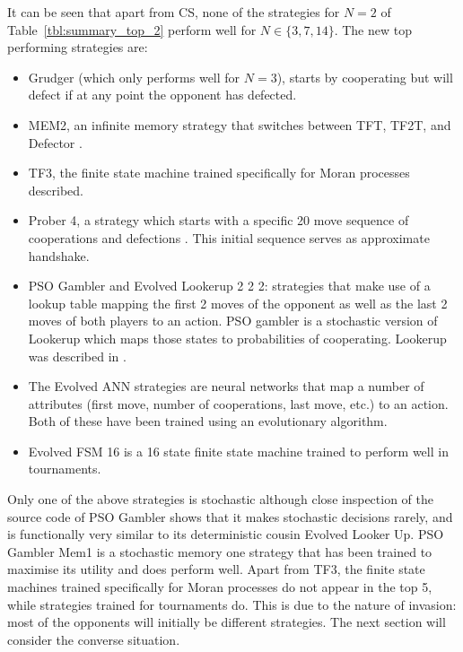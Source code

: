 \documentclass[10pt,letterpaper]{article}
\begin{document}
It can be seen that apart from CS, none of the strategies for \(N=2\)
of Table~\ref{tbl:summary_top_2} perform well for \(N\in\{3, 7, 14\}\). The new
top performing strategies are:

\begin{itemize}
    \item Grudger (which only performs well for \(N=3\)), starts by cooperating
        but will defect if at any point the opponent has defected.
    \item MEM2, an infinite memory strategy that switches between TFT, TF2T, and
        Defector \cite{Li2014}.
    \item TF3, the finite state machine trained specifically for Moran processes
        described.
    \item Prober 4, a strategy which starts with a specific 20 move sequence of
        cooperations and defections \cite{Prison1998}. This initial sequence serves
        as approximate handshake.
    \item  PSO Gambler and Evolved Lookerup 2 2 2: strategies that make use
        of a lookup table mapping the first 2 moves of the opponent as well as
        the last 2 moves of both players to an action.  PSO gambler is a
        stochastic version of  Lookerup which maps those states to probabilities
       of cooperating. Lookerup was described in \cite{Knight2016}.
    \item The Evolved ANN strategies are neural networks that map a number of
	    attributes (first move, number of cooperations, last move, etc.) to
	    an action. Both of these have been trained using an evolutionary
	    algorithm.
    \item Evolved FSM 16 is a 16 state finite state machine trained to
        perform well in tournaments.
\end{itemize}

Only one of the above strategies is stochastic although close inspection of the
source code of PSO Gambler shows that it makes stochastic decisions rarely, and
is functionally very similar to its deterministic cousin Evolved Looker Up.
PSO Gambler Mem1 is a stochastic memory one strategy that has been trained to
maximise its utility and does perform well.
Apart from TF3, the finite state machines trained specifically for
Moran processes do not appear in the top 5, while strategies trained for
tournaments do. This is due to the nature of invasion: most of the opponents
will initially be different strategies. The next section will consider the
converse situation.
\end{document}
